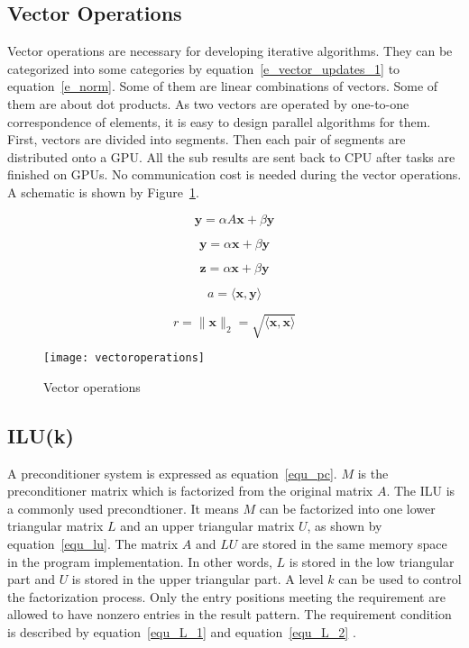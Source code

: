 \documentclass[runningheads,a4paper]{llncs}
\newcommand{\vect}[1]{\boldsymbol{#1}}
\begin{document}
{\subsection{Vector Operations}

Vector operations are necessary for developing iterative algorithms. They can be categorized into some categories by equation~\eqref{e_vector_updates_1} to equation~\eqref{e_norm}. Some of them are linear combinations of vectors. Some of them are about dot products. As two vectors are operated by one-to-one correspondence of elements, it is easy to design parallel algorithms for them. First, vectors are divided into segments. Then each pair of segments are distributed onto a GPU. All the sub results are sent back to CPU after tasks are finished on GPUs. No communication cost is needed during the vector operations. A schematic is shown by Figure~\ref{fig_vectoroperations}.

\begin{equation}
\label{e_vector_updates_1}
\vect{y} = \alpha A \vect{x} + \beta \vect{y}
\end{equation}

\begin{equation}
\label{e_vector_updates_2}
\vect{y} = \alpha \vect{x} + \beta \vect{y}
\end{equation}

\begin{equation}
\label{e_vector_updates_3}
\vect{z} = \alpha \vect{x} + \beta \vect{y}
\end{equation}

\begin{equation}
\label{e_dot_product}
a = \langle \vect{x}, \vect{y} \rangle
\end{equation}

\begin{equation}
\label{e_norm}
r = \|\vect{x}\|_2 = \sqrt{\langle \vect{x}, \vect{x}\rangle}
\end{equation}

\begin{figure}[!tbh]
    \centering
    \texttt{[image: vectoroperations]}
    \caption{Vector operations}
    \label{fig_vectoroperations}
\end{figure}

\subsection{ILU(k)}
A preconditioner system is expressed as equation~\eqref{equ_pc}. $M$ is the preconditioner matrix which is factorized from the original matrix $A$. The ILU is a commonly used precondtioner. It means $M$ can be factorized into one lower triangular matrix $L$ and an upper triangular matrix $U$, as shown by equation~\eqref{equ_lu}. The matrix $A$ and $LU$ are stored in the same memory space in the program implementation. In other words, $L$ is stored in the low triangular part and $U$ is stored in the upper triangular part. A level $k$ can be used to control the factorization process. Only the entry positions meeting the requirement are allowed to have nonzero entries in the result pattern. The requirement condition is described by equation~\eqref{equ_L_1} and equation~\eqref{equ_L_2} \cite{saad}.

}
\end{document}
